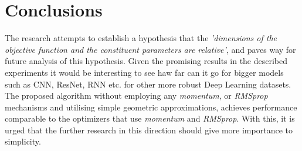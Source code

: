 \documentclass{article}
\begin{document}
\section{Conclusions}
The research attempts to establish a hypothesis that the \textit{'dimensions of the objective function and the constituent parameters are relative'}, and paves way for future analysis of this hypothesis. Given the promising results in the described experiments it would be interesting to see haw far can it go for bigger models such as CNN, ResNet, RNN etc. for other more robust Deep Learning datasets. The proposed algorithm without employing any \textit{momentum}, or \textit{RMSprop} mechanisms and utilising simple geometric approximations, achieves performance  comparable to the optimizers that use \textit{momentum }and \textit{RMSprop}. With this, it is urged that the further research in this direction should give more importance to simplicity.




\end{document}
